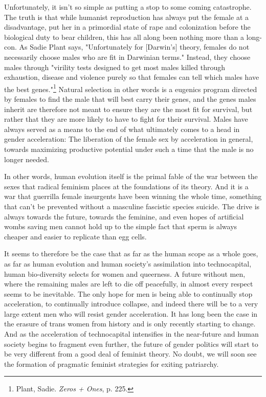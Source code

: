 \documentclass[10pt, statementpaper, twoside, openright]{memoir}
\begin{document}
Unfortunately, it isn't so simple as putting a stop to some coming catastrophe. The truth is that while humanist reproduction has always put the female at a disadvantage, put her in a primordial state of rape and colonization before the biological duty to bear children, this has all along been nothing more than a long-con. As Sadie Plant says, "Unfortunately for [Darwin's] theory, females do not necessarily choose males who are fit in Darwinian terms." Instead, they choose males through "virility tests designed to get most males killed through exhaustion, disease and violence purely so that females can tell which males have the best genes."\footnote{Plant, Sadie. \textit{Zeros + Ones}, p. 225.} Natural selection in other words is a eugenics program directed by females to find the male that will best carry their genes, and the genes males inherit are therefore not meant to ensure they are the most fit for survival, but rather that they are more likely to have to fight for their survival. Males have always served as a means to the end of what ultimately comes to a head in gender acceleration: The liberation of the female sex by acceleration in general, towards maximizing productive potential under such a time that the male is no longer needed.

In other words, human evolution itself is the primal fable of the war between the sexes that radical feminism places at the foundations of its theory. And it is a war that guerrilla female insurgents have been winning the whole time, something that can't be prevented without a masculine fascistic species suicide. The drive is always towards the future, towards the feminine, and even hopes of artificial wombs saving men cannot hold up to the simple fact that sperm is always cheaper and easier to replicate than egg cells.

It seems to therefore be the case that as far as the human scope as a whole goes, as far as human evolution and human society's assimilation into technocapital, human bio-diversity selects for women and queerness. A future without men, where the remaining males are left to die off peacefully, in almost every respect seems to be inevitable. The only hope for men is being able to continually stop acceleration, to continually introduce collapse, and indeed there will be to a very large extent men who will resist gender acceleration. It has long been the case in the erasure of trans women from history and is only recently starting to change. And as the acceleration of technocapital intensifies in the near-future and human society begins to fragment even further, the future of gender politics will start to be very different from a good deal of feminist theory. No doubt, we will soon see the formation of pragmatic feminist strategies for exiting patriarchy.
\end{document}
